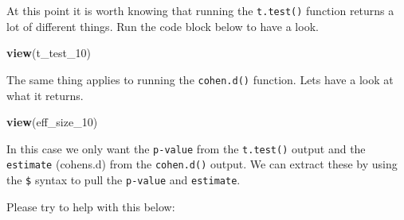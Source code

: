 \documentclass[
]{book}
\newenvironment{Shaded}{\begin{snugshade}}{\end{snugshade}}
\newcommand{\FunctionTok}[1]{\textcolor[rgb]{0.13,0.29,0.53}{\textbf{#1}}}
\newcommand{\NormalTok}[1]{#1}
\newcommand{\OtherTok}[1]{\textcolor[rgb]{0.56,0.35,0.01}{#1}}
\newcommand{\SpecialCharTok}[1]{\textcolor[rgb]{0.81,0.36,0.00}{\textbf{#1}}}
\begin{document}
At this point it is worth knowing that running the \texttt{t.test()} function returns a lot of different things. Run the code block below to have a look.

\begin{Shaded}
\begin{Highlighting}[]
\FunctionTok{view}\NormalTok{(t\_test\_10)}
\end{Highlighting}
\end{Shaded}

The same thing applies to running the \texttt{cohen.d()} function. Lets have a look at what it returns.

\begin{Shaded}
\begin{Highlighting}[]
\FunctionTok{view}\NormalTok{(eff\_size\_10)}
\end{Highlighting}
\end{Shaded}

In this case we only want the \texttt{p-value} from the \texttt{t.test()} output and the \texttt{estimate} (cohens.d) from the \texttt{cohen.d()} output. We can extract these by using the \texttt{\$} syntax to pull the \texttt{p-value} and \texttt{estimate}.

Please try to help with this below:

\begin{Shaded}
\end{Shaded}
\end{document}
